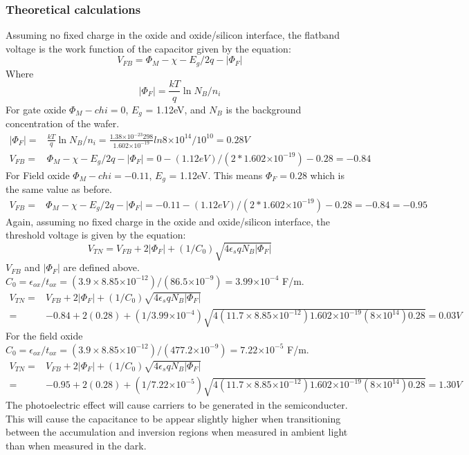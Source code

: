 \documentclass{article}
\providecommand{\e}[1]{\ensuremath{\times 10^{#1}}}
\begin{document}
\subsubsection{Theoretical calculations}
Assuming no fixed charge in the oxide and oxide/silicon interface, the flatband voltage is the work function of the capacitor given by the equation:
\begin{equation}
V_{FB} = \Phi_M - \chi - E_g/2q - |\Phi_F|
\end{equation}
Where
\begin{equation}
|\Phi_F| = \frac{kT}{q}\ln{N_B/n_i}
\end{equation}
For gate oxide $\Phi_M - chi = 0$, $E_g$ = 1.12eV, and $N_B$ is the background concentration of the wafer.
\begin{align*}
|\Phi_F| =& \frac{kT}{q}\ln{N_B/n_i} = \frac{1.38\e{-23}298}{1.602\e{-19}}ln{8\e{14}/10^{10}} = 0.28V \\
V_{FB} =& \Phi_M - \chi - E_g/2q - |\Phi_F| = 0 - (1.12eV)/(2*1.602\e{-19}) - 0.28 = -0.84
\end{align*}
For Field oxide $\Phi_M - chi = -0.11$, $E_g$ = 1.12eV. This means $\Phi_F = 0.28$ which is the same value as before.
\begin{align*}
V_{FB} =& \Phi_M - \chi - E_g/2q - |\Phi_F| = -0.11 - (1.12eV)/(2*1.602\e{-19}) - 0.28 = -0.84 = -0.95
\end{align*} 
Again, assuming no fixed charge in the oxide and oxide/silicon interface, the threshold voltage is given by the equation:
\begin{equation}
V_{TN} = V_{FB} + 2|\Phi_F| + (1/C_0)\sqrt{4 \epsilon_s q N_B |\Phi_F|}
\end{equation}
$V_{FB}$ and $|\Phi_F|$ are defined above. $C_0 =\epsilon_{ox}/t_{ox} = (3.9\times8.85\e{-12})/(86.5\e{-9}) = 3.99\e{-4}$ F/m.
\begin{align*}
V_{TN} =& V_{FB} + 2|\Phi_F| + (1/C_0)\sqrt{4 \epsilon_s q N_B |\Phi_F|} \\
=& -0.84 + 2(0.28) + (1/3.99\e{-4})\sqrt{4(11.7\times 8.85\e{-12})1.602\e{-19}(8\e{14})0.28} = 0.03 V
\end{align*}
For the field oxide $C_0 =\epsilon_{ox}/t_{ox} = (3.9\times8.85\e{-12})/(477.2\e{-9}) = 7.22\e{-5}$ F/m.
\begin{align*}
V_{TN} =& V_{FB} + 2|\Phi_F| + (1/C_0)\sqrt{4 \epsilon_s q N_B |\Phi_F|} \\
=& -0.95 + 2(0.28) + (1/7.22\e{-5})\sqrt{4(11.7\times 8.85\e{-12})1.602\e{-19}(8\e{14})0.28} = 1.30 V
\end{align*}
The photoelectric effect will cause carriers to be generated in the semiconducter. This will cause the capacitance to be appear slightly higher when transitioning between the accumulation and inversion regions when measured in ambient light than when measured in the dark.
\end{document}
